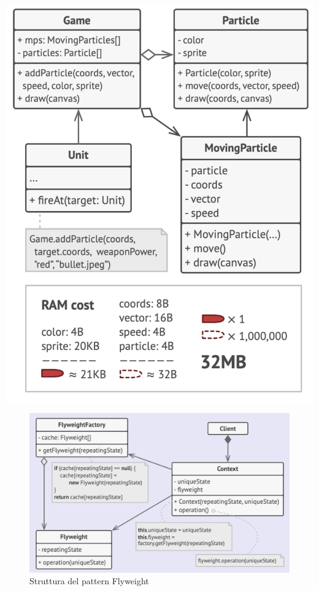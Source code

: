 \begin{minipage}{0.5\linewidth}
    \includegraphics[width=1\linewidth]{assets/pattern/flyweight/flyweight-esempio.png}
\end{minipage}

\begin{figure}[H]
    \centering
    \includegraphics[width=1\linewidth]{assets/pattern/flyweight/flyweight-struttura.png}
    \caption{Struttura del pattern Flyweight}
\end{figure}

